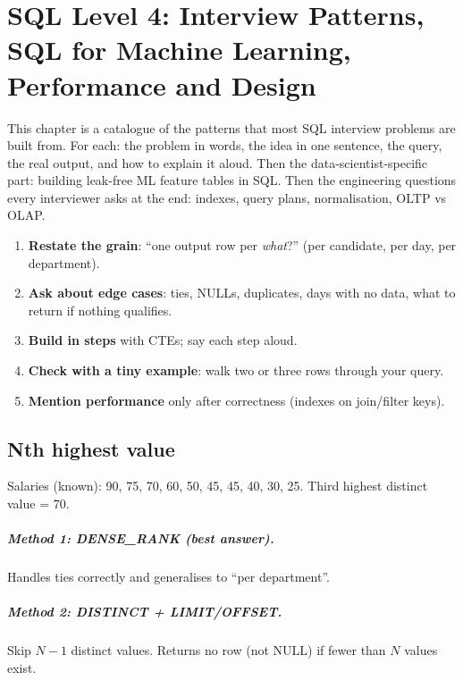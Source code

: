 \chapter{SQL Level 4: Interview Patterns, SQL for Machine Learning, Performance and Design}\label{ch:sql4}

This chapter is a catalogue of the patterns that most SQL interview problems are built from. For each: the problem in words, the idea in one sentence,
the query, the real output, and how to explain it aloud. Then the data-scientist-specific part: building leak-free ML feature tables in SQL. Then the
engineering questions every interviewer asks at the end: indexes, query plans, normalisation, OLTP vs OLAP.

\begin{recap}
\begin{enumerate}
\item \textbf{Restate the grain}: ``one output row per \emph{what}?'' (per candidate, per day, per department).
\item \textbf{Ask about edge cases}: ties, NULLs, duplicates, days with no data, what to return if nothing qualifies.
\item \textbf{Build in steps} with CTEs; say each step aloud.
\item \textbf{Check with a tiny example}: walk two or three rows through your query.
\item \textbf{Mention performance} only after correctness (indexes on join/filter keys).
\end{enumerate}
\end{recap}

\section{Nth highest value}
Salaries (known): 90, 75, 70, 60, 50, 45, 45, 40, 30, 25. Third highest distinct value = 70.
\paragraph{Method 1: DENSE\_RANK (best answer).} Handles ties correctly and generalises to ``per department''.
\paragraph{Method 2: DISTINCT + LIMIT/OFFSET.} Skip $N-1$ distinct values. Returns no row (not NULL) if fewer than $N$ values exist.
